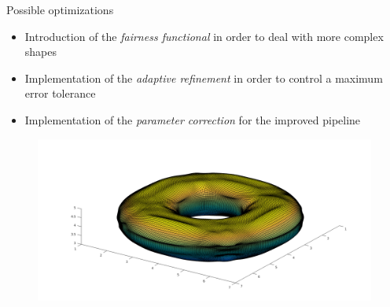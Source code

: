 %

\begin{frame}{Possible optimizations}
\begin{itemize}
\item Introduction of the \textit{fairness functional} in order to deal with more complex shapes
\item Implementation of the \textit{adaptive refinement} in order to control a maximum error tolerance
\item Implementation of the \textit{parameter correction} for the improved pipeline
\end{itemize}
\begin{figure}
\includegraphics[width=\textwidth]{Pictures/NURBS/torus_from_DC.png}
\end{figure}
\end{frame}
